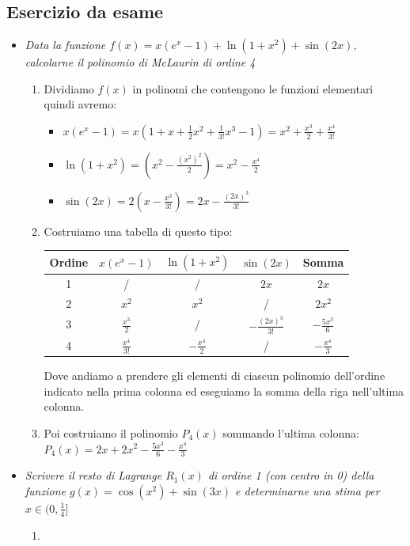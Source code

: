 \documentclass[10pt, a4paper]{article}
\begin{document}
    \subsection{Esercizio da esame}
        \begin{itemize}
            \item \textit{Data la funzione $f(x)=x(e^x-1)+\ln(1+x^2)+\sin(2x)$, calcolarne il polinomio di McLaurin di ordine 4} \begin{enumerate}
                \item Dividiamo $f(x)$ in polinomi che contengono le funzioni elementari quindi avremo: \begin{itemize}
                    \item $x(e^x-1)=x\left(1+x+\frac{1}{2}x^2+\frac{1}{3!}x^3-1\right)=x^2+\frac{x^3}{2}+\frac{x^4}{3!}$
                    \item $\ln(1+x^2)=\left(x^2-\frac{(x^2)^2}{2}\right)=x^2-\frac{x^4}{2}$
                    \item $\sin(2x)=2\left(x-\frac{x^3}{3!}\right)=2x-\frac{(2x)^3}{3!}$
                \end{itemize}
                \item Costruiamo una tabella di questo tipo: 
                \begin{center}
                    \begin{tabular}{| c | c | c | c | c |}
                        \hline
                        \textbf{Ordine} & $x(e^x-1)$ & $\ln(1+x^2)$ & $\sin(2x)$ & \textbf{Somma}\\
                        \hline
                        1 & / & / & $2x$ & $2x$ \\
                        \hline
                        2 & $x^2$ & $x^2$ & / & $2x^2$\\
                        \hline
                        3 & $\frac{x^3}{2}$ & / & $-\frac{(2x)^3}{3!}$ & $-\frac{5x^3}{6}$\\
                        \hline
                        4 & $\frac{x^4}{3!}$ & $-\frac{x^4}{2}$ & / & $-\frac{x^4}{3}$\\
                        \hline
                    \end{tabular}
                \end{center}
                Dove andiamo a prendere gli elementi di ciascun polinomio dell'ordine indicato nella prima colonna ed eseguiamo la somma della riga nell'ultima colonna.
                \item Poi costruiamo il polinomio $P_4(x)$ sommando l'ultima colonna: $P_4(x)=2x+2x^2-\frac{5x^3}{6}-\frac{x^4}{3}$
            \end{enumerate}
            \item \textit{Scrivere il resto di Lagrange $R_1(x)$ di ordine 1 (con centro in 0) della funzione $g(x)=\cos(x^2)+\sin(3x)$ e determinarne una stima per $x\in(0,\frac{1}{4}]$} \begin{enumerate}
                \item %
            \end{enumerate}
        \end{itemize}
\end{document}
